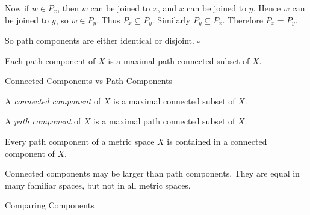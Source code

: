 \documentclass[12pt, a4paper]{article}
\begin{document}
Now if $w\in P_x$, then $w$ can be joined to $x$, and $x$ can be joined to $y$. Hence $w$ can be joined to $y$, so $w\in P_y$. Thus $P_x\subseteq P_y$. Similarly $P_y\subseteq P_x$. Therefore $P_x=P_y$.

So path components are either identical or disjoint. \hfill $\square$

\vfill

\begin{theorem}[Maximality]
Each path component of $X$ is a maximal path connected subset of $X$.
\end{theorem}

\clearpage

\begin{heading}
    Connected Components vs Path Components
\end{heading}

\vspace{10pt}

\begin{definition}
A \textit{connected component} of $X$ is a maximal connected subset of $X$.
\end{definition}

\vspace{60pt}

\begin{definition}
A \textit{path component} of $X$ is a maximal path connected subset of $X$.
\end{definition}

\vspace{60pt}

\begin{theorem}
Every path component of a metric space $X$ is contained in a connected component of $X$.
\end{theorem}

\vspace{60pt}

\begin{problem}[Remark]
Connected components may be larger than path components. They are equal in many familiar spaces, but not in all metric spaces.
\end{problem}

\clearpage

\begin{heading}
    Comparing Components
\end{heading}

\vspace{10pt}
\end{document}
